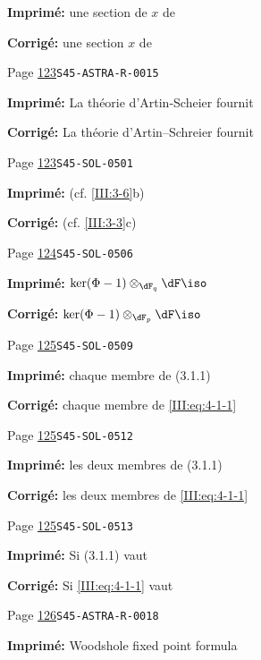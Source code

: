 \begin{description}
\par\noindent\textbf{Imprimé:} une section de $x$ de
\par\noindent\textbf{Corrigé:} une section $x$ de
\smallskip
\item[\hypertarget{apparatus:FR-0082}{82}] Page \hyperlink{printpage:fr:123}{123}\quad\texttt{S45-ASTRA-R-0015}
\par\noindent\textbf{Imprimé:} La théorie d'Artin-Scheier fournit
\par\noindent\textbf{Corrigé:} La théorie d'Artin--Schreier fournit
\smallskip
\item[\hypertarget{apparatus:FR-0083}{83}] Page \hyperlink{printpage:fr:123}{123}\quad\texttt{S45-SOL-0501}
\par\noindent\textbf{Imprimé:} (cf. \ref{III:3-6}b)
\par\noindent\textbf{Corrigé:} (cf. \ref{III:3-3}c)
\smallskip
\item[\hypertarget{apparatus:FR-0084}{84}] Page \hyperlink{printpage:fr:124}{124}\quad\texttt{S45-SOL-0506}
\par\noindent\textbf{Imprimé:} \(\ker(\Phi-1)\otimes_{\dF_q}\dF \iso\)
\par\noindent\textbf{Corrigé:} \(\ker(\Phi-1)\otimes_{\dF_p}\dF \iso\)
\smallskip
\item[\hypertarget{apparatus:FR-0085}{85}] Page \hyperlink{printpage:fr:125}{125}\quad\texttt{S45-SOL-0509}
\par\noindent\textbf{Imprimé:} chaque membre de (3.1.1)
\par\noindent\textbf{Corrigé:} chaque membre de \eqref{III:eq:4-1-1}
\smallskip
\item[\hypertarget{apparatus:FR-0086}{86}] Page \hyperlink{printpage:fr:125}{125}\quad\texttt{S45-SOL-0512}
\par\noindent\textbf{Imprimé:} les deux membres de (3.1.1)
\par\noindent\textbf{Corrigé:} les deux membres de \eqref{III:eq:4-1-1}
\smallskip
\item[\hypertarget{apparatus:FR-0087}{87}] Page \hyperlink{printpage:fr:125}{125}\quad\texttt{S45-SOL-0513}
\par\noindent\textbf{Imprimé:} Si (3.1.1) vaut
\par\noindent\textbf{Corrigé:} Si \eqref{III:eq:4-1-1} vaut
\smallskip
\item[\hypertarget{apparatus:FR-0088}{88}] Page \hyperlink{printpage:fr:126}{126}\quad\texttt{S45-ASTRA-R-0018}
\par\noindent\textbf{Imprimé:} Woodshole fixed point formula

\end{description}
